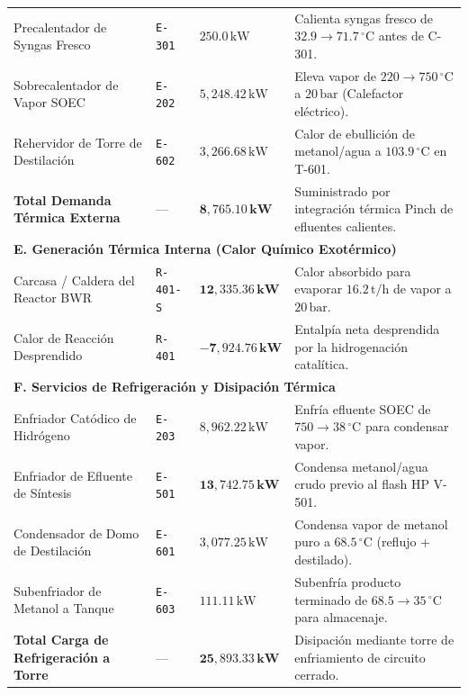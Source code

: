 \documentclass[11pt,a4paper]{article}
\begin{document}
\begin{table}[H]
\begin{tabular}{p{5.5cm} p{1.8cm} p{3.2cm} p{4.2cm}}
\midrule
Precalentador de Syngas Fresco & \texttt{E-301} & $250.0\,\text{kW}$ & Calienta syngas fresco de $32.9 \to 71.7\,^\circ\text{C}$ antes de C-301. \\
Sobrecalentador de Vapor SOEC & \texttt{E-202} & $5{,}248.42\,\text{kW}$ & Eleva vapor de $220 \to 750\,^\circ\text{C}$ a $20\,\text{bar}$ (Calefactor eléctrico). \\
Rehervidor de Torre de Destilación & \texttt{E-602} & $3{,}266.68\,\text{kW}$ & Calor de ebullición de metanol/agua a $103.9\,^\circ\text{C}$ en T-601. \\
\midrule
\textbf{Total Demanda Térmica Externa} & --- & $\mathbf{8{,}765.10\,\text{kW}}$ & Suministrado por integración térmica Pinch de efluentes calientes. \\
\midrule
\multicolumn{4}{l}{\textbf{E. Generación Térmica Interna (Calor Químico Exotérmico)}} \\
\midrule
Carcasa / Caldera del Reactor BWR & \texttt{R-401-S} & $\mathbf{12{,}335.36\,\text{kW}}$ & Calor absorbido para evaporar $16.2\,\text{t/h}$ de vapor a $20\,\text{bar}$. \\
Calor de Reacción Desprendido & \texttt{R-401} & $\mathbf{-7{,}924.76\,\text{kW}}$ & Entalpía neta desprendida por la hidrogenación catalítica. \\
\midrule
\multicolumn{4}{l}{\textbf{F. Servicios de Refrigeración y Disipación Térmica}} \\
\midrule
Enfriador Catódico de Hidrógeno & \texttt{E-203} & $8{,}962.22\,\text{kW}$ & Enfría efluente SOEC de $750 \to 38\,^\circ\text{C}$ para condensar vapor. \\
Enfriador de Efluente de Síntesis & \texttt{E-501} & $\mathbf{13{,}742.75\,\text{kW}}$ & Condensa metanol/agua crudo previo al flash HP V-501. \\
Condensador de Domo de Destilación & \texttt{E-601} & $3{,}077.25\,\text{kW}$ & Condensa vapor de metanol puro a $68.5\,^\circ\text{C}$ (reflujo + destilado). \\
Subenfriador de Metanol a Tanque & \texttt{E-603} & $111.11\,\text{kW}$ & Subenfría producto terminado de $68.5 \to 35\,^\circ\text{C}$ para almacenaje. \\
\midrule
\textbf{Total Carga de Refrigeración a Torre} & --- & $\mathbf{25{,}893.33\,\text{kW}}$ & Disipación mediante torre de enfriamiento de circuito cerrado. \\
\bottomrule
\end{tabular}
\end{table}
\end{document}
